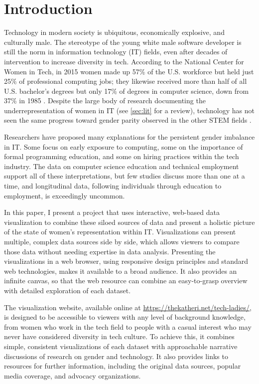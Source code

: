\section{Introduction}
Technology in modern society is ubiquitous, economically explosive, and culturally male. The stereotype of the young white male software developer is still the norm in information technology (IT) fields, even after decades of intervention to increase diversity in tech. According to the National Center for Women in Tech, in 2015 women made up 57\% of the U.S. workforce but held just 25\% of professional computing jobs; they likewise received more than half of all U.S. bachelor's degrees but only 17\% of degrees in computer science, down from 37\% in 1985 \citep{NCWIT2016Women}. Despite the large body of research documenting the underrepresentation of women in IT (see \autoref{sec:lit} for a review), technology has not seen the same progress toward gender parity observed in the other STEM fields \citep{GlassEtAl2013Whats}.

Researchers have proposed many explanations for the persistent gender imbalance in IT\@. Some focus on early exposure to computing, some on the importance of formal programming education, and some on hiring practices within the tech industry. The data on computer science education and technical employment support all of these interpretations, but few studies discuss more than one at a time, and longitudinal data, following individuals through education to employment, is exceedingly uncommon.

In this paper, I present a project that uses interactive, web-based data visualization to combine these siloed sources of data and present a holistic picture of the state of women's representation within IT\@. Visualizations can present multiple, complex data sources side by side, which allows viewers to compare those data without needing expertise in data analysis. Presenting the visualizations in a web browser, using responsive design principles and standard web technologies, makes it available to a broad audience. It also provides an infinite canvas, so that the web resource can combine an easy-to-grasp overview with detailed exploration of each dataset.

The visualization website, available online at \url{https://thekatheri.net/tech-ladies/}, is designed to be accessible to viewers with any level of background knowledge, from women who work in the tech field to people with a casual interest who may never have considered diversity in tech culture. To achieve this, it combines simple, consistent visualizations of each dataset with approachable narrative discussions of research on gender and technology. It also provides links to resources for further information, including the original data sources, popular media coverage, and advocacy organizations.

